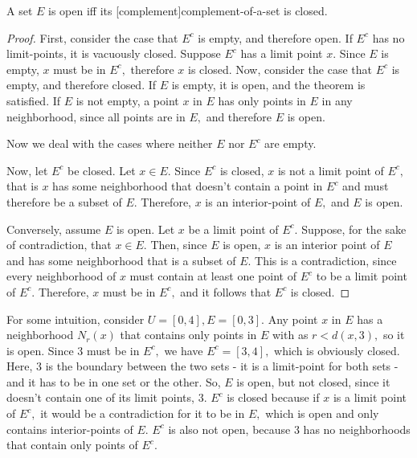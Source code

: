 \documentclass{article}
\begin{document}
\begin{theorem}\label{open-iff-complement-closed}
A set $E$ is \@{open} iff its \@[complement]{complement-of-a-set} is \@{closed}.
\end{theorem}

\begin{proof}
First, consider the case that $E^c$ is empty, and therefore \@{open}. If $E^c$ has no \@{limit-points}, it is vacuously \@{closed}. Suppose $E^c$ has a limit point $x.$ Since $E$ is empty, $x$ must be in $E^c,$ therefore $x$ is closed. Now, consider the case that $E^c$ is empty, and therefore closed. If $E$ is empty, it is open, and the theorem is satisfied. If $E$ is not empty, a point $x$ in $E$ has only points in $E$ in any \@{neighborhood}, since all points are in $E,$ and therefore $E$ is open.

Now we deal with the cases where neither $E$ nor $E^c$ are empty.

Now, let $E^c$ be closed. Let $x \in E.$ Since $E^c$ is closed, $x$ is not a limit point of $E^c,$ that is $x$ has some neighborhood that doesn't contain a point in $E^c$ and must therefore be a subset of $E.$ Therefore, $x$ is an \@{interior-point} of $E,$ and $E$ is open.

Conversely, assume $E$ is open. Let $x$ be a limit point of $E^c.$ Suppose, for the sake of contradiction, that $x \in E.$ Then, since $E$ is open, $x$ is an interior point of $E$ and has some neighborhood that is a subset of $E.$ This is a contradiction, since every neighborhood of $x$ must contain at least one point of $E^c$ to be a limit point of $E^c.$ Therefore, $x$ must be in $E^c,$ and it follows that $E^c$ is closed.
\end{proof}

\detach

\begin{remark}\label{open-closed-intuition}
For some intuition, consider $U = [0, 4], E = [0,3].$ Any point $x$ in $E$ has a \@{neighborhood} $N_r(x)$ that contains only points in $E$ with as $r < d(x, 3),$ so it is \@{open}. Since 3 must be in $E^c,$ we have $E^c = [3,4],$ which is obviously \@{closed}. Here, 3 is the boundary between the two sets - it is a \@{limit-point} for both sets - and it has to be in one set or the other. So, $E$ is open, but not closed, since it doesn't contain one of its limit points, 3. $E^c$ is closed because if $x$ is a limit point of $E^c,$ it would be a contradiction for it to be in $E,$ which is open and only contains \@{interior-points} of $E.$ $E^c$ is also not open, because 3 has no neighborhoods that contain only points of $E^c.$
\end{remark}
\end{document}
